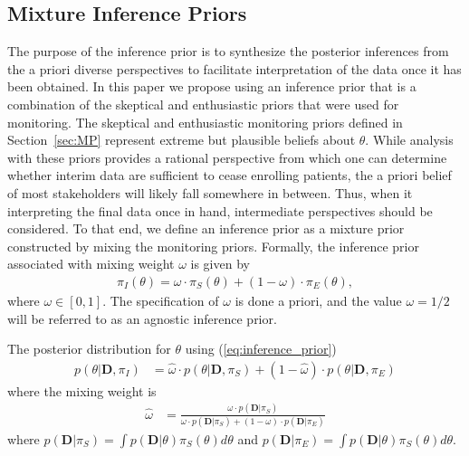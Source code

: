 \documentclass[12pt]{article}
\begin{document}
\subsection{Mixture Inference Priors}
The purpose of the inference prior is to synthesize the posterior inferences from the a priori diverse perspectives to facilitate interpretation of the data once it has been obtained. In this paper we propose using an inference prior that is a combination of the skeptical and enthusiastic priors that were used for monitoring.
%
The skeptical and enthusiastic monitoring priors defined in Section~\ref{sec:MP} represent extreme but plausible beliefs about $\theta$.
%
While analysis with these priors provides a rational perspective from which one can determine whether interim data are sufficient 
to cease enrolling patients, the a priori belief of most stakeholders will likely fall somewhere in between.
%
Thus, when it interpreting the final data once in hand, intermediate perspectives should be considered.
%
To that end, we define an inference prior as a mixture prior constructed by mixing the monitoring priors.
%
Formally, the inference prior associated with mixing weight $\omega$ is given by
\begin{align}\label{eq:inference_prior}
\pi_{I}\left(\theta\right)=\omega\cdot\pi_{S}\left(\theta\right)+(1-\omega) \cdot \pi_E\left(\theta\right),
\end{align}
where $\omega\in[0,1]$. 
%
The specification of $\omega$ is done a priori, and the value $\omega=1/2$ will be referred to as an agnostic inference prior.
%

The posterior distribution for $\theta$ using (\ref{eq:inference_prior})
\begin{align}
p(\theta|\mathbf{D},\pi_I)&=\hat{\omega}\cdot p(\theta|\mathbf{D},\pi_S)+(1-\hat{\omega})\cdot p(\theta|\mathbf{D},\pi_E)
\end{align}
where the mixing weight is
\begin{align}
\hat{\omega}&=\frac{\omega\cdot p(\mathbf{D}|\pi_S)}{\omega\cdot p(\mathbf{D}|\pi_S)+(1-\omega)\cdot p(\mathbf{D}|\pi_E)}
\end{align}
where $p(\mathbf{D}|\pi_S)=\int p(\mathbf{D}|\theta)\pi_S(\theta)d\theta$ and $p(\mathbf{D}|\pi_E)=\int p(\mathbf{D}|\theta)\pi_S(\theta)d\theta$. 
\end{document}
